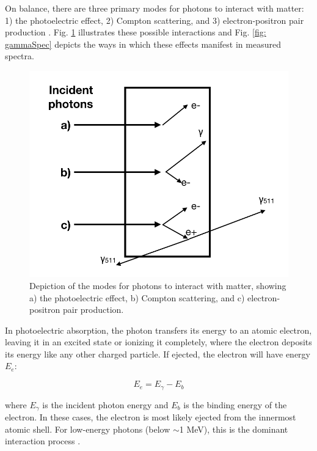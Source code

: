 On balance, there are three primary modes for photons to interact with matter: 1) the photoelectric effect, 2) Compton scattering, and 3) electron-positron pair production \cite{KnollBook}. Fig. \ref{fig: radiationInteraction} illustrates these possible interactions and Fig. \ref{fig: gammaSpec} depicts the ways in which these effects manifest in measured spectra. 


\begin{figure}
\centering
\includegraphics[width=0.8\linewidth]{figures/photonInteraction.png}
\caption{Depiction of the modes for photons to interact with matter, showing a) the photoelectric effect, b) Compton scattering, and c) electron-positron pair production. }
\label{fig: radiationInteraction}
\end{figure}


In photoelectric absorption, the photon transfers its energy to an atomic electron, leaving it in an excited state or ionizing it completely, where the electron deposits its energy like any other charged particle. If ejected, the electron will have energy $E_{e}$:

\begin{equation}
E_{e} = E_{\gamma} - E_{b}
\end{equation} 

\noindent where $E_{\gamma}$ is the incident photon energy and $E_{b}$ is the binding energy of the electron. In these cases, the electron is most likely ejected from the innermost atomic shell. For low-energy photons (below $\sim$1 MeV), this is the dominant interaction process \cite{KnollBook}. 

